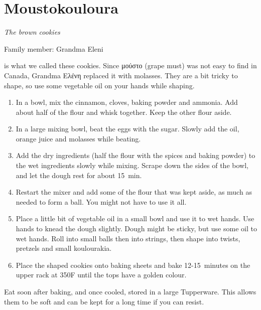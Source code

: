 \chapter{Moustokouloura}
\label{ch:moustokouloura}


\textit{The brown cookies}

Family member: Grandma Eleni

 is what we called these cookies. Since \textgreek{μούστο} (grape must) was not easy to find in Canada, Grandma \textgreek{Ελένη} replaced it with molasses. They are a bit tricky to shape, so use some vegetable oil on your hands while shaping.

\begin{enumerate}
    \item In a bowl, mix the cinnamon, cloves, baking powder and ammonia. Add about half of the flour and whisk together. Keep the other flour aside.
    \item In a large mixing bowl, beat the eggs with the sugar. Slowly add the oil, orange juice and molasses while beating.
    \item Add the dry ingredients (half the flour with the spices and baking powder) to the wet ingredients slowly while mixing. Scrape down the sides of the bowl, and let the dough rest for about 15~min.
    \item Restart the mixer and add some of the flour that was kept aside, as much as needed to form a ball. You might not have to use it all.
    \item Place a little bit of vegetable oil in a small bowl and use it to wet hands. Use hands to knead the dough slightly. Dough might be sticky, but use some oil to wet hands. Roll into small balls then into strings, then shape into twists, pretzels and small koulourakia.
    \item Place the shaped cookies onto baking sheets and bake 12-15~minutes on the upper rack at 350\degree F until the tops have a golden colour.
\end{enumerate}

Eat soon after baking, and once cooled, stored in a large Tupperware. This allows them to be soft and can be kept for a long time if you can resist.


